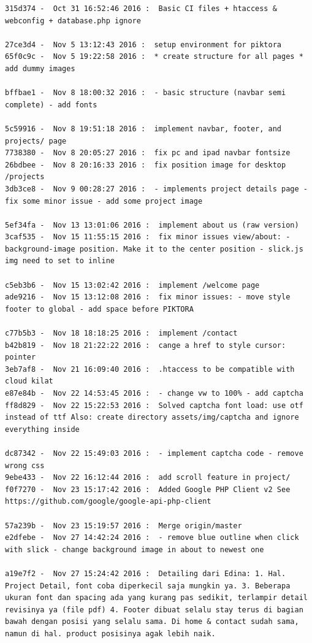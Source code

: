 \begin{lstlisting}[caption={Histori \textit{commit} pada proyek Piktora},label={lst:all_commit_piktora},language=plaintext]
315d374 -  Oct 31 16:52:46 2016 :  Basic CI files + htaccess & webconfig + database.php ignore

27ce3d4 -  Nov 5 13:12:43 2016 :  setup environment for piktora
65f0c9c -  Nov 5 19:22:58 2016 :  * create structure for all pages * add dummy images

bffbae1 -  Nov 8 18:00:32 2016 :  - basic structure (navbar semi complete) - add fonts

5c59916 -  Nov 8 19:51:18 2016 :  implement navbar, footer, and projects/ page
7738380 -  Nov 8 20:05:27 2016 :  fix pc and ipad navbar fontsize
26bdbee -  Nov 8 20:16:33 2016 :  fix position image for desktop /projects
3db3ce8 -  Nov 9 00:28:27 2016 :  - implements project details page - fix some minor issue - add some project image

5ef34fa -  Nov 13 13:01:06 2016 :  implement about us (raw version)
3caf535 -  Nov 15 11:55:15 2016 :  fix minor issues view/about: - background-image position. Make it to the center position - slick.js img need to set to inline

c5eb3b6 -  Nov 15 13:02:42 2016 :  implement /welcome page
ade9216 -  Nov 15 13:12:08 2016 :  fix minor issues: - move style footer to global - add space before PIKTORA

c77b5b3 -  Nov 18 18:18:25 2016 :  implement /contact
b42b819 -  Nov 18 21:22:22 2016 :  cange a href to style cursor: pointer
3eb7af8 -  Nov 21 16:09:40 2016 :  .htaccess to be compatible with cloud kilat
e87e84b -  Nov 22 14:53:45 2016 :  - change vw to 100% - add captcha
ff8d829 -  Nov 22 15:22:53 2016 :  Solved captcha font load: use otf instead of ttf Also: create directory assets/img/captcha and ignore everything inside

dc87342 -  Nov 22 15:49:03 2016 :  - implement captcha code - remove wrong css
9ebe433 -  Nov 22 16:12:44 2016 :  add scroll feature in project/
f0f7270 -  Nov 23 15:17:42 2016 :  Added Google PHP Client v2 See https://github.com/google/google-api-php-client

57a239b -  Nov 23 15:19:57 2016 :  Merge origin/master
e2dfebe -  Nov 27 14:42:24 2016 :  - remove blue outline when click with slick - change background image in about to newest one

a19e7f2 -  Nov 27 15:24:42 2016 :  Detailing dari Edina: 1. Hal. Project Detail, font coba diperkecil saja mungkin ya. 3. Beberapa ukuran font dan spacing ada yang kurang pas sedikit, terlampir detail revisinya ya (file pdf) 4. Footer dibuat selalu stay terus di bagian bawah dengan posisi yang selalu sama. Di home & contact sudah sama, namun di hal. product posisinya agak lebih naik.


\end{lstlisting}
